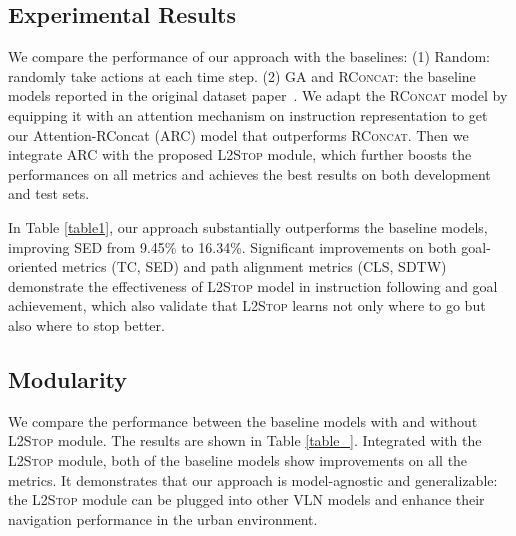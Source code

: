 \documentclass[11pt,a4paper]{article}
\begin{document}
\subsection{Experimental Results}
We compare the performance of our approach with the baselines: (1) Random: randomly take actions at each time step. (2) GA and \textsc{RConcat}: the baseline models reported in the original dataset paper~\cite{chen2019touchdown}.
We adapt the \textsc{RConcat} model by equipping it with an attention mechanism on instruction representation to get our Attention-RConcat (ARC) model that outperforms \textsc{RConcat}.
Then we integrate ARC with the proposed \textsc{L2Stop} module, which further boosts the performances on all metrics and achieves the best results on both development and test sets.

In Table \ref{table1}, our approach substantially outperforms the baseline models, improving SED from 9.45\% to 16.34\%. Significant improvements on both goal-oriented metrics (TC, SED) and path alignment metrics (CLS, SDTW) demonstrate the effectiveness of \textsc{L2Stop} model in instruction following and goal achievement, which also validate that \textsc{L2Stop} learns not only where to go but also where to stop better.

\begin{table}[t]
\small
  \centering
  \setlength{\tabcolsep}{3pt}
  \caption{Ablation study results for individual components on the development set.}
  \label{table2}
\end{table}

\subsection{Modularity}
We compare the performance between the baseline models with and without \textsc{L2Stop} module. The results are shown in Table \ref{table_}. Integrated with the \textsc{L2Stop} module, both of the baseline models show improvements on all the metrics. It demonstrates that our approach is model-agnostic and generalizable: the \textsc{L2Stop} module can be plugged into other VLN models and enhance their navigation performance in the urban environment. 
\end{document}
